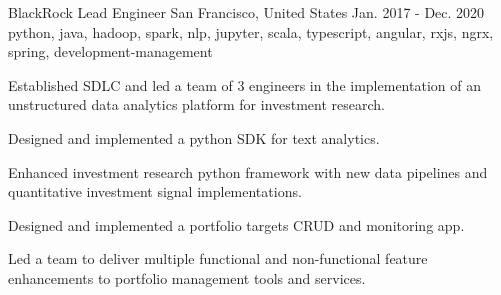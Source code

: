 \cventry
    {BlackRock} %
    {Lead Engineer} %
    {San Francisco, United States} %
    {Jan. 2017 - Dec. 2020} %
    { python, java, hadoop, spark, nlp, jupyter, scala, typescript, angular, rxjs, ngrx, spring, development-management} %
    {
    \begin{cvitems} %
        \item { Established SDLC and led a team of 3 engineers in the implementation of an unstructured data analytics platform for investment research.  }
        \item { Designed and implemented a python SDK for text analytics. }
        \item { Enhanced investment research python framework with new data pipelines and quantitative investment signal implementations. }
        \item { Designed and implemented a portfolio targets CRUD and monitoring app. }
        \item { Led a team to deliver multiple functional and non-functional feature enhancements to portfolio management tools and services. }
    \end{cvitems}
    }





